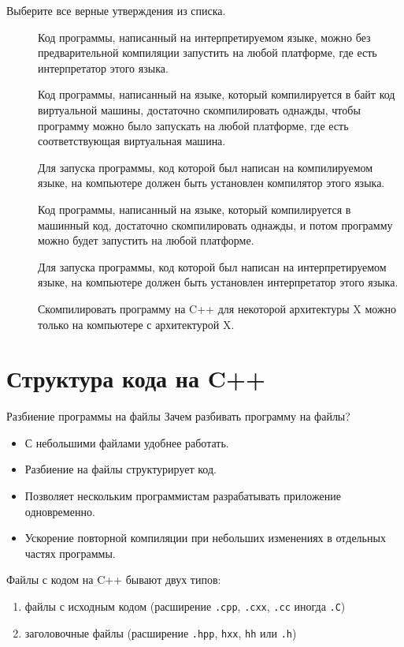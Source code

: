 \documentclass[9pt]{beamer}
\begin{document}
\begin{frame}
    Выберите все верные утверждения из списка.
    \begin{description}
        \item[\XBox]  Код программы, написанный на интерпретируемом языке, можно без предварительной компиляции запустить на любой платформе, где есть интерпретатор этого языка.
        \item[\XBox]  Код программы, написанный на языке, который компилируется в байт код виртуальной машины, достаточно скомпилировать однажды, чтобы программу можно было запускать на любой платформе, где есть соответствующая виртуальная машина.
        \item[\Square]  Для запуска программы, код которой был написан на компилируемом языке, на компьютере должен быть установлен компилятор этого языка.
        \item[\Square]  Код программы, написанный на языке, который компилируется в машинный код, достаточно скомпилировать однажды, и потом программу можно будет запустить на любой платформе.
        \item[\XBox] Для запуска программы, код которой был написан на интерпретируемом языке, на компьютере должен быть установлен интерпретатор этого языка.
        \item[\Square] Скомпилировать программу на C++ для некоторой архитектуры X можно только на компьютере с архитектурой X.
    \end{description}
\end{frame}

\section{Структура кода на C++}
\begin{frame}{Разбиение программы на файлы}
    Зачем разбивать программу на файлы?
    \begin{itemize}
        \item С небольшими файлами удобнее работать.
        \item Разбиение на файлы структурирует код.
        \item Позволяет нескольким программистам разрабатывать приложение одновременно.
        \item Ускорение повторной компиляции при небольших изменениях в отдельных частях программы.
    \end{itemize}
    Файлы с кодом на C++ бывают двух типов:
    \begin{enumerate}
        \item файлы с исходным кодом (расширение \texttt{.cpp}, \texttt{.cxx}, \texttt{.cc} иногда \texttt{.C})
        \item заголовочные файлы (расширение \texttt{.hpp}, \texttt{hxx}, \texttt{hh}  или \texttt{.h})
    \end{enumerate}
\end{frame}
\end{document}
